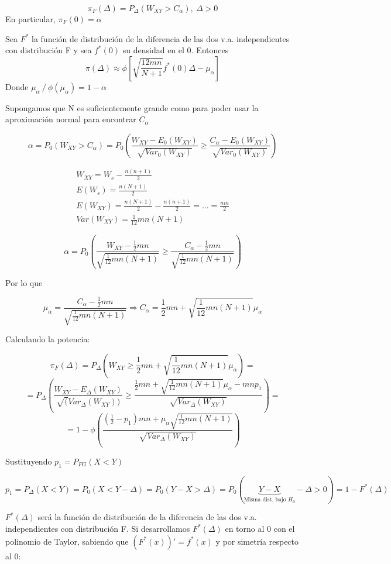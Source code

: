 $$
\pi_F(\Delta)=P_\Delta(W_{XY}>C_\alpha),\ \Delta>0
$$
En particular, $\pi_F(0)=\alpha$

\begin{theorem}
    Sea $F^*$ la función de distribución de la diferencia de las dos v.a. independientes con distribución F y sea $f^*(0)$ su densidad en el 0. Entonces
    $$
    \pi(\Delta)\approx\phi\left[\sqrt{\frac{12mn}{N+1}}f^*(0)\Delta-\mu_\alpha\right]
    $$
    Donde $\mu_\alpha\ /\ \phi(\mu_\alpha)=1-\alpha$
\end{theorem}

Supongamos que N es suficientemente grande como para poder usar la aproximación normal para encontrar $C_\alpha$

$$
\alpha = P_0(W_{XY}>C_\alpha)=P_0\left(\frac{W_{XY}-E_0(W_{XY})}{\sqrt{Var_0(W_{XY})}}\geq \frac{C_\alpha-E_0(W_{XY})}{\sqrt{Var_0(W_{XY})}}\right)
$$

$$
\begin{array}{c}
    W_{XY}=W_s-\frac{n(n+1)}{2}\\
    E(W_s)=\frac{n(N+1)}{2}\\
    E(W_{XY})=\frac{n(N+1)}{2}-\frac{n(n+1)}{2}=\dots=\frac{nm}{2}\\
    Var(W_{XY})=\frac{1}{12}mn(N+1)
\end{array}
$$

$$
\alpha=P_0\left(\frac{W_{XY}-\frac{1}{2}mn}{\sqrt{\frac{1}{12}mn(N+1)}}\geq \frac{C_\alpha-\frac{1}{2}mn}{\sqrt{\frac{1}{12}mn(N+1)}}\right)
$$

Por lo que 

$$
\mu_\alpha=\frac{C_\alpha-\frac{1}{2}mn}{\sqrt{\frac{1}{12}mn(N+1)}} \Longrightarrow C_\alpha=\frac{1}{2}mn+\sqrt{\frac{1}{12}mn(N+1)}\mu_\alpha
$$

Calculando la potencia:

$$
\pi_F(\Delta)=P_\Delta\left(W_{XY}\geq\frac{1}{2}mn+\sqrt{\frac{1}{12}mn(N+1)}\mu_\alpha\right)=
$$
$$
=P_\Delta\left(\frac{W_{XY}-E_\Delta(W_{XY})}{\sqrt(Var_\Delta(W_{XY}))}\geq\frac{\frac{1}{2}mn+\sqrt{\frac{1}{12}mn(N+1)}\mu_\alpha-mnp_1}{\sqrt{Var_\Delta(W_{XY})}} \right)=
$$
$$
=1-\phi\left(\frac{\left(\frac{1}{2}-p_1\right)mn+\mu_\alpha\sqrt{\frac{1}{12}mn(N+1)}}{\sqrt{Var_\Delta(W_{XY})}}\right)
$$

Sustituyendo $p_1=P_{FG}(X<Y)$

$$
p_1=P_\Delta(X<Y)=P_0(X<Y-\Delta)=P_0(Y-X>\Delta)=P_0(\underbrace{Y-X}_\text{Misma dist. bajo $H_0$}-\Delta>0)=1-F^*(\Delta)
$$

$F^*(\Delta)$ será la función de distribución de la diferencia de las dos v.a. independientes con distribución F. Si desarrollamos $F^*(\Delta)$ en torno al 0 con el polinomio de Taylor, sabiendo que $(F^*(x))'=f^*(x)$ y por simetría respecto al 0:

